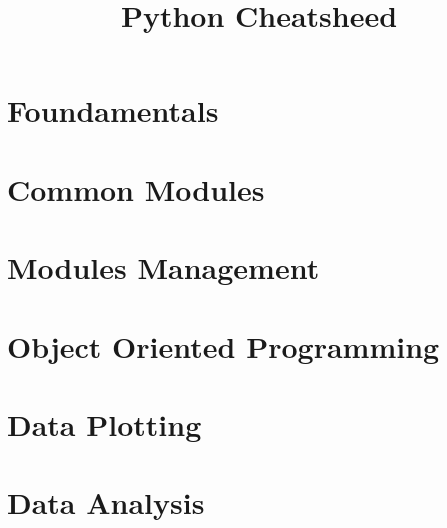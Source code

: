 \documentclass[10pt,landscape,a4paper]{article}
\title{Python Cheatsheed}
\author{}
\date{}
\begin{document}
    \maketitle
    \footnotesize           %

    \begin{multicols}{3}
        \tableofcontents
    \end{multicols}
    \newpage



    \section{Foundamentals}
        \begin{multicols}{3}
            
        \end{multicols}
    \newpage


    \section{Common Modules}
        \begin{multicols}{3}
            
        \end{multicols}
    \newpage


    \section{Modules Management}
        \begin{multicols}{3}
            
        \end{multicols} 
    \newpage


    \section{Object Oriented Programming}
        \begin{multicols}{3}
            
        \end{multicols}
    \newpage


    \section{Data Plotting}
        \begin{multicols}{3}
            
        \end{multicols}
    \newpage


    \section{Data Analysis}
        \begin{multicols}{3}
            
        \end{multicols} 
    \newpage
\end{document}
